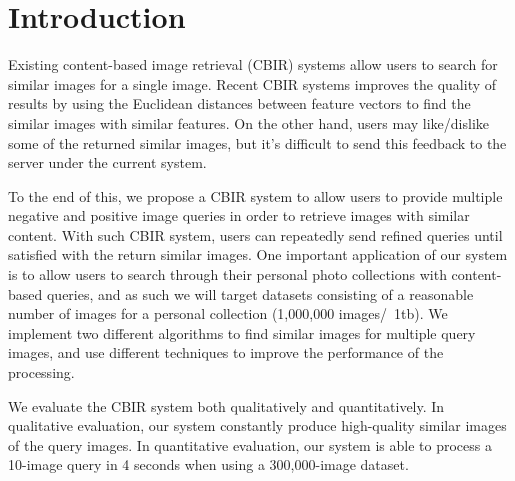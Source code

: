 \section{Introduction}
Existing content-based image retrieval (CBIR) systems allow users to search for similar images
for a single image. Recent CBIR systems improves the quality of results by
using the Euclidean distances between feature
vectors to find the similar images with similar features. On the other hand, users
may like/dislike some of the returned similar images, but it's difficult to send this
feedback to the server under the current system.

To the end of this, we propose a CBIR system to allow users to provide multiple negative and positive image queries in order to retrieve images with similar content.
With such CBIR system, users can repeatedly send refined queries until satisfied with
the return similar images.
One important application of our system is to allow users to search through their personal photo collections with content-based queries, and as
such we will target datasets consisting of a reasonable number of images for a personal collection (1,000,000 images/~1tb).
We implement two different algorithms to find similar images for multiple query images, and
use different techniques to improve the performance of the processing.

We evaluate the CBIR system both qualitatively and quantitatively. In qualitative evaluation, our
system constantly produce high-quality similar images of the query images. In quantitative
evaluation, our system is able to process a 10-image query in 4 seconds when using a 300,000-image
dataset.



